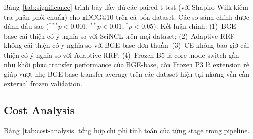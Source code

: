 Bảng~\ref{tab:significance} trình bày đầy đủ các paired t-test (với Shapiro-Wilk kiểm tra phân phối chuẩn)
cho nDCG@10 trên cả bốn dataset. Các so sánh chính được đánh dấu sao (${}^{***}p<0.001$, ${}^{**}p<0.01$,
${}^{*}p<0.05$). Kết luận chính: (1)~BGE-base cải thiện có ý nghĩa so với SciNCL trên mọi dataset;
(2)~Adaptive RRF không cải thiện có ý nghĩa so với BGE-base đơn thuần; (3)~CE không bao giờ cải thiện
có ý nghĩa so với Adaptive RRF; (4)~Frozen B5 là core mode-switch gần như khôi phục transfer performance
của BGE-base, còn Frozen P3 là extension rẻ giúp vượt nhẹ BGE-base transfer average trên các dataset hiện
tại nhưng vẫn cần external frozen validation.



\subsection{Cost Analysis}
\label{sec:results:cost}

Bảng~\ref{tab:cost-analysis} tổng hợp chi phí tính toán của từng stage trong pipeline.


